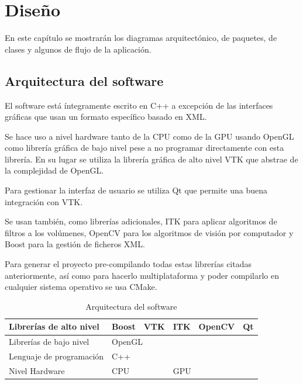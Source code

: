 \chapter{Diseño}

En este capítulo se mostrarán los diagramas arquitectónico, de paquetes, de clases y algunos de flujo de la aplicación.

\section{Arquitectura del software}

El software está íntegramente escrito en C++ a excepción de las interfaces gráficas que usan un formato específico basado en XML.

Se hace uso a nivel hardware tanto de la CPU como de la GPU usando OpenGL como librería gráfica de bajo nivel pese a no programar directamente con esta librería. En su lugar se utiliza la librería gráfica de alto nivel VTK que abstrae de la complejidad de OpenGL.

Para gestionar la interfaz de usuario se utiliza Qt que permite una buena integración con VTK.

Se usan también, como librerías adicionales, ITK para aplicar algoritmos de filtros a los volúmenes, OpenCV para los algoritmos de visión por computador y Boost para la gestión de ficheros XML.

Para generar el proyecto pre-compilando todas estas librerías citadas anteriormente, así como para hacerlo multiplataforma y poder compilarlo en cualquier sistema operativo se usa CMake.

\begin{table}[H]
	\begin{center}
		\begin{tabular}{|l|c|c|c|c|c|}
			\hline
			Librerías de alto nivel  & Boost        & VTK       & ITK    & OpenCV   & Qt   \\ \hline
			Librerías de bajo nivel  & \multicolumn{5}{l|}{OpenGL}                         \\ \hline
			Lenguaje de programación & \multicolumn{5}{l|}{C++}                            \\ \hline
			Nivel Hardware           & \multicolumn{2}{l|}{CPU} & \multicolumn{3}{l|}{GPU} \\ \hline
		\end{tabular}
	\end{center}
	\caption{Arquitectura del software}
	\label{tab:diseno/diagrama-arquitectonico}
\end{table}

